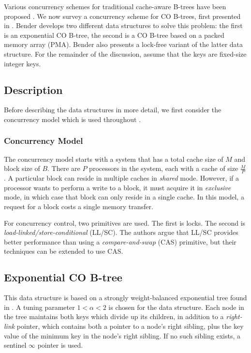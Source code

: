 \documentclass{style}
\begin{document}
Various concurrency schemes for traditional cache-aware B-trees have been
proposed \cite{BayerS77, LehmanY81}. We now survey a concurrency scheme for CO
B-trees, first presented in \cite{BenderFiGi05}. Bender develops two different
data structures to solve this problem: the first is an exponential CO B-tree,
the second is a CO B-tree based on a packed memory array (PMA). Bender
also presents a lock-free variant of the latter data structure. For
the remainder of the discussion, assume that the keys are fixed-size integer
keys.

\subsection{Description}
Before describing the data structures in more detail, we first consider
the concurrency model which is used throughout \cite{BenderFiGi05}.

\subsubsection{Concurrency Model}
The concurrency model starts with a system that has a total cache
size of $M$ and block size of $B$. There are $P$ processors in the
system, each with a cache of size $\frac{M}{P}$. A particular block
can reside in multiple caches in \textit{shared} mode. However, if a
processor wants to perform a write to a block, it must acquire it in 
\textit{exclusive} mode, in which case that block can only reside in
a single cache. In this model, a request for a block costs a single
memory transfer.

For concurrency control, two primitives are used. The first is
locks. The second is \textit{load-linked/store-conditional} (LL/SC).
The authors argue that LL/SC provides better performance than 
using a \textit{compare-and-swap} (CAS) primitive, but their 
techniques can be extended to use CAS.

\subsection{Exponential CO B-tree}
This data structure is based on a strongly weight-balanced 
exponential tree found in \cite{Bender2002}. A tuning parameter
$1 < \alpha < 2$ is chosen for the data structure. Each node
in the tree maintains both keys which divide up its children,
in addition to a \textit{right-link} pointer, which contains
both a pointer to a node's right sibling, plus the key
value of the minimum key in the node's right sibling. If no such
sibling exists, a sentinel $\infty$ pointer is used.
\end{document}
